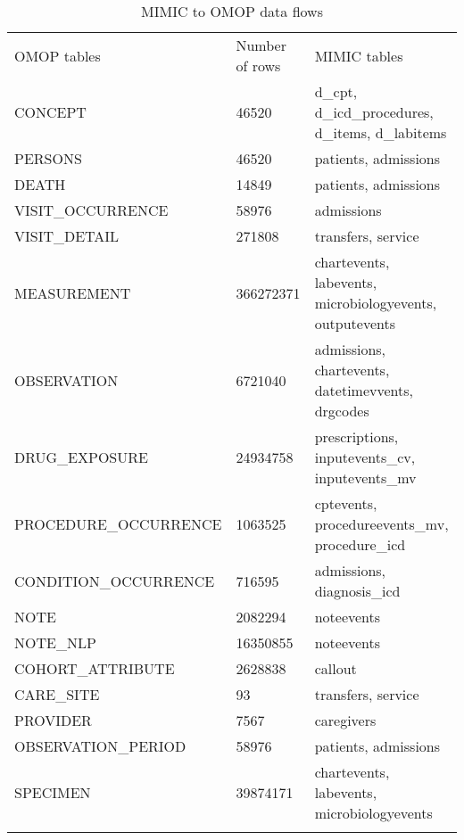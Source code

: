 \begin{table*}[t]
\caption{MIMIC to OMOP data flows}
\begin{tabular}{@{}lll@{}}\toprule
OMOP tables           & Number of rows & MIMIC tables                                             \\\colrule
CONCEPT               & 46520          & d\_cpt, d\_icd\_procedures, d\_items, d\_labitems        \\
PERSONS               & 46520          & patients, admissions                                     \\
DEATH                 & 14849          & patients, admissions                                     \\
VISIT\_OCCURRENCE     & 58976          & admissions                                               \\
VISIT\_DETAIL         & 271808         & transfers, service                                       \\
MEASUREMENT           & 366272371      & chartevents, labevents, microbiologyevents, outputevents \\
OBSERVATION           & 6721040        & admissions, chartevents, datetimevvents, drgcodes        \\
DRUG\_EXPOSURE        & 24934758       & prescriptions, inputevents\_cv, inputevents\_mv          \\
PROCEDURE\_OCCURRENCE & 1063525        & cptevents, procedureevents\_mv, procedure\_icd           \\
CONDITION\_OCCURRENCE & 716595         & admissions, diagnosis\_icd                               \\
NOTE                  & 2082294        & noteevents                                               \\
NOTE\_NLP             & 16350855       & noteevents                                               \\
COHORT\_ATTRIBUTE     & 2628838        & callout                                                  \\
CARE\_SITE            & 93             & transfers, service                                       \\
PROVIDER              & 7567           & caregivers                                               \\
OBSERVATION\_PERIOD   & 58976          & patients, admissions                                     \\
SPECIMEN              & 39874171       & chartevents, labevents, microbiologyevents               \\\botrule
\end{tabular}
\label{table:dispatch}
\end{table*}
 
